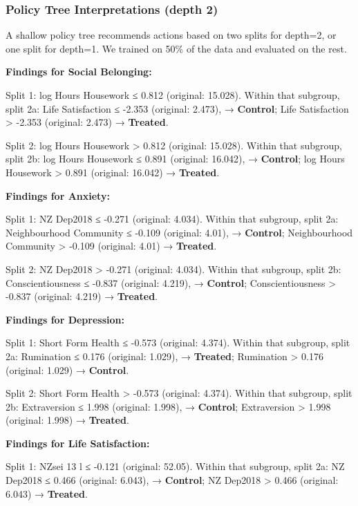 \documentclass[
  single column]{article}
\begin{document}
\newpage{}

\subsubsection{Policy Tree Interpretations (depth
2)}\label{policy-tree-interpretations-depth-2}

A shallow policy tree recommends actions based on two splits for
depth=2, or one split for depth=1. We trained on 50\% of the data and
evaluated on the rest.

\textbf{Findings for Social Belonging:}

Split 1: log Hours Housework ≤ 0.812 (original: 15.028). Within that
subgroup, split 2a: Life Satisfaction ≤ -2.353 (original: 2.473), →
\textbf{Control}; Life Satisfaction \textgreater{} -2.353 (original:
2.473) → \textbf{Treated}.

Split 2: log Hours Housework \textgreater{} 0.812 (original: 15.028).
Within that subgroup, split 2b: log Hours Housework ≤ 0.891 (original:
16.042), → \textbf{Control}; log Hours Housework \textgreater{} 0.891
(original: 16.042) → \textbf{Treated}.

\textbf{Findings for Anxiety:}

Split 1: NZ Dep2018 ≤ -0.271 (original: 4.034). Within that subgroup,
split 2a: Neighbourhood Community ≤ -0.109 (original: 4.01), →
\textbf{Control}; Neighbourhood Community \textgreater{} -0.109
(original: 4.01) → \textbf{Treated}.

Split 2: NZ Dep2018 \textgreater{} -0.271 (original: 4.034). Within that
subgroup, split 2b: Conscientiousness ≤ -0.837 (original: 4.219), →
\textbf{Control}; Conscientiousness \textgreater{} -0.837 (original:
4.219) → \textbf{Treated}.

\textbf{Findings for Depression:}

Split 1: Short Form Health ≤ -0.573 (original: 4.374). Within that
subgroup, split 2a: Rumination ≤ 0.176 (original: 1.029), →
\textbf{Treated}; Rumination \textgreater{} 0.176 (original: 1.029) →
\textbf{Control}.

Split 2: Short Form Health \textgreater{} -0.573 (original: 4.374).
Within that subgroup, split 2b: Extraversion ≤ 1.998 (original: 1.998),
→ \textbf{Control}; Extraversion \textgreater{} 1.998 (original: 1.998)
→ \textbf{Treated}.

\textbf{Findings for Life Satisfaction:}

Split 1: NZsei 13 l ≤ -0.121 (original: 52.05). Within that subgroup,
split 2a: NZ Dep2018 ≤ 0.466 (original: 6.043), → \textbf{Control}; NZ
Dep2018 \textgreater{} 0.466 (original: 6.043) → \textbf{Treated}.
\end{document}
